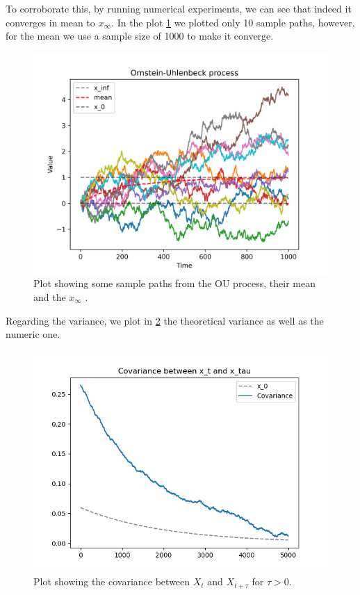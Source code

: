 \documentclass[a4paper,12pt]{article} %
\begin{document}
To corroborate this, by running numerical experiments, we can see that indeed it converges in mean to \(x_\infty \). In the plot \ref{fig:my_image} we plotted only 10 sample paths, however, for the mean we use a sample size of 1000 to make it converge.

\begin{figure}[h!]
    \centering
    \includegraphics[width=1\textwidth]{plots/ou_process.png} %
    \caption{Plot showing some sample paths from the OU process, their mean and the \(x_\infty \) .}
    \label{fig:my_image}
\end{figure}

Regarding the variance, we plot in \ref{fig:covariance} the theoretical variance as well as the numeric one.


\begin{figure}[h!]
    \centering
    \includegraphics[width=1\textwidth]{plots/covariance.png} %
    \caption{Plot showing the covariance between \(X_t\) and \(X_{t+\tau } \) for \(\tau >0\).}
    \label{fig:covariance}
\end{figure}
\end{document}

